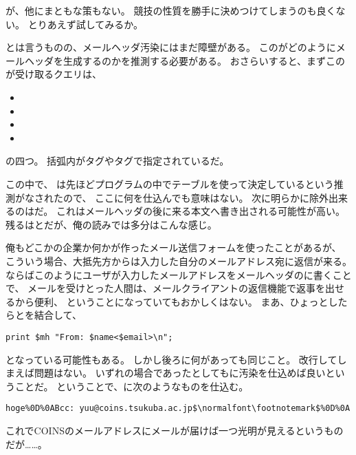 が、他にまともな策もない。
競技の性質を勝手に決めつけてしまうのも良くない。
とりあえず試してみるか。

とは言うものの、メールヘッダ汚染にはまだ障壁がある。
このがどのようにメールヘッダを生成するのかを推測する必要がある。
おさらいすると、まずこのが受け取るクエリは、

\begin{itemize}
	\item {}
	\item {}
	\item {}
	\item {}
\end{itemize}

の四つ。
括弧内がタグやタグで指定されているだ。

この中で、
は先ほどプログラムの中でテーブルを使って決定しているという推測がなされたので、
ここに何を仕込んでも意味はない。
次に明らかに除外出来るのはだ。
これはメールヘッダの後に来る本文へ書き出される可能性が高い。
残るはとだが、俺の読みでは多分はこんな感じ。



俺もどこかの企業か何かが作ったメール送信フォームを使ったことがあるが、
こういう場合、大抵先方からは入力した自分のメールアドレス宛に返信が来る。
ならばこのようにユーザが入力したメールアドレスをメールヘッダのに書くことで、
メールを受けとった人間は、メールクライアントの返信機能で返事を出せるから便利、
ということになっていてもおかしくはない。
まあ、ひょっとしたらとを結合して、

\begin{lstlisting}[style=perl, firstnumber=11]
print $mh "From: $name<$email>\n";
\end{lstlisting}

となっている可能性もある。
しかし後ろに何があっても同じこと。
改行してしまえば問題はない。
いずれの場合であったとしてもに汚染を仕込めば良いということだ。
ということで、に次のようなものを仕込む。

\begin{lstlisting}[mathescape]
hoge%0D%0ABcc: yuu@coins.tsukuba.ac.jp$\normalfont\footnotemark$%0D%0A
\end{lstlisting}

これでCOINSのメールアドレスにメールが届けば一つ光明が見えるというものだが……。




